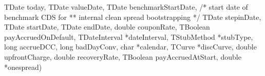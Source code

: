 TDate           today,
 TDate           valueDate,
 TDate           benchmarkStartDate,  /* start date of benchmark CDS for
                                      ** internal clean spread bootstrapping */
 TDate           stepinDate,
 TDate           startDate,
 TDate           endDate,
 double          couponRate,
 TBoolean        payAccruedOnDefault,
 TDateInterval  *dateInterval,
 TStubMethod    *stubType,
 long            accrueDCC,
 long            badDayConv,
 char           *calendar,
 TCurve         *discCurve,
 double          upfrontCharge,
 double          recoveryRate,
 TBoolean        payAccruedAtStart,
 double         *onespread)

